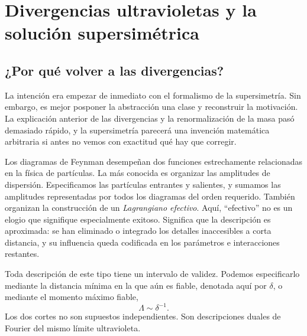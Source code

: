 \chapter{Divergencias ultravioletas y la solución supersimétrica}


\section{¿Por qué volver a las divergencias?}

La intención era empezar de inmediato con el formalismo de la supersimetría. Sin embargo, es mejor posponer la abstracción una clase y reconstruir la motivación. La explicación anterior de las divergencias y la renormalización de la masa pasó demasiado rápido, y la supersimetría parecerá una invención matemática arbitraria si antes no vemos con exactitud qué hay que corregir.

Los diagramas de Feynman desempeñan dos funciones estrechamente relacionadas en la física de partículas. La más conocida es organizar las amplitudes de dispersión. Especificamos las partículas entrantes y salientes, y sumamos las amplitudes representadas por todos los diagramas del orden requerido. También organizan la construcción de un \emph{Lagrangiano efectivo}. Aquí, ``efectivo'' no es un elogio que signifique especialmente exitoso. Significa que la descripción es aproximada: se han eliminado o integrado los detalles inaccesibles a corta distancia, y su influencia queda codificada en los parámetros e interacciones restantes.

Toda descripción de este tipo tiene un intervalo de validez. Podemos especificarlo mediante la distancia mínima en la que aún es fiable, denotada aquí por \(\delta\), o mediante el momento máximo fiable,
\begin{equation}
\Lambda\sim \delta^{-1}.
\end{equation}
Los dos cortes no son supuestos independientes. Son descripciones duales de Fourier del mismo límite ultravioleta.

